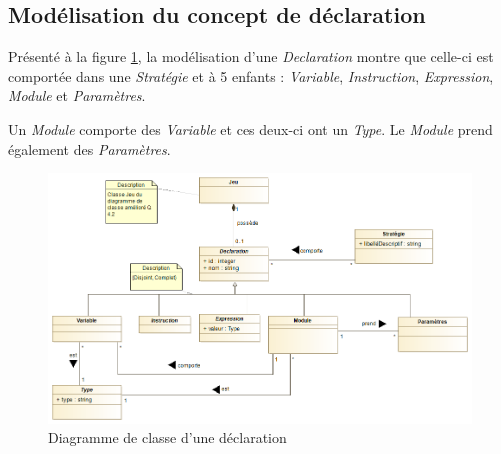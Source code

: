 
\subsection{Modélisation du concept de déclaration}
\label{sec:question9}

Présenté à la figure \ref{fig:declaration}, la modélisation d'une \emph{Declaration} montre que celle-ci est comportée dans une \emph{Stratégie} et à 5 enfants : \emph{Variable}, \emph{Instruction}, \emph{Expression}, \emph{Module} et \emph{Paramètres}.

Un \emph{Module} comporte des \emph{Variable} et ces deux-ci ont un \emph{Type}. Le \emph{Module} prend également des \emph{Paramètres}.

\begin{figure}
	\centering
	\includegraphics[width=500pt]{assets/class__Declaration}
	\caption{Diagramme de classe d'une déclaration}
	\label{fig:declaration}
\end{figure}
